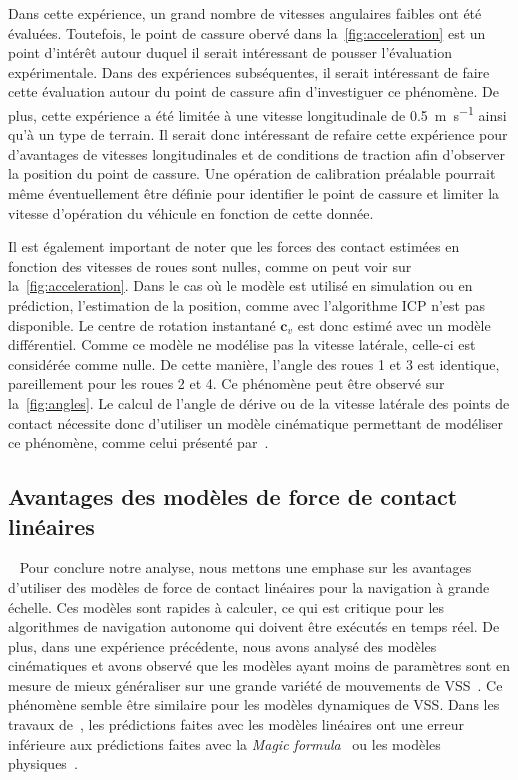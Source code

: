 Dans cette expérience, un grand nombre de vitesses angulaires faibles ont été évaluées.
Toutefois, le point de cassure obervé dans la~\autoref{fig:acceleration} est un point d'intérêt autour duquel il serait intéressant de pousser l'évaluation expérimentale.
Dans des expériences subséquentes, il serait intéressant de faire cette évaluation autour du point de cassure afin d'investiguer ce phénomène.
De plus, cette expérience a été limitée à une vitesse longitudinale de \SI{0.5}{\meter\per\second} ainsi qu'à un type de terrain.
Il serait donc intéressant de refaire cette expérience pour d'avantages de vitesses longitudinales et de conditions de traction afin d'observer la position du point de cassure.
Une opération de calibration préalable pourrait même éventuellement être définie pour identifier le point de cassure et limiter la vitesse d'opération du véhicule en fonction de cette donnée.

Il est également important de noter que les forces des contact estimées en fonction des vitesses de roues sont nulles, comme on peut voir sur la~\autoref{fig:acceleration}.
Dans le cas où le modèle est utilisé en simulation ou en prédiction, l'estimation de la position, comme avec l'algorithme \ac{ICP} n'est pas disponible.
Le centre de rotation instantané $\bm c_v$ est donc estimé avec un modèle différentiel.
Comme ce modèle ne modélise pas la vitesse latérale, celle-ci est considérée comme nulle. 
De cette manière, l'angle des roues 1 et 3 est identique, pareillement pour les roues 2 et 4.
Ce phénomène peut être observé sur la~\autoref{fig:angles}.
Le calcul de l'angle de dérive ou de la vitesse latérale des points de contact nécessite donc d'utiliser un modèle cinématique permettant de modéliser ce phénomène, comme celui présenté par~\citet{Seegmiller2014}.

\subsection{Avantages des modèles de force de contact linéaires}~\label{sec:ana_lineaire}
Pour conclure notre analyse, nous mettons une emphase sur les avantages d'utiliser des modèles de force de contact linéaires pour la navigation à grande échelle.
Ces modèles sont rapides à calculer, ce qui est critique pour les algorithmes de navigation autonome qui doivent être exécutés en temps réel.
De plus, dans une expérience précédente, nous avons analysé des modèles cinématiques et avons observé que les modèles ayant moins de paramètres sont en mesure de mieux généraliser sur une grande variété de mouvements de \ac{VSS}~\citep{Baril2020}.
Ce phénomène semble être similaire pour les modèles dynamiques de \ac{VSS}. 
Dans les travaux de~\citet{Seegmiller2016}, les prédictions faites avec les modèles linéaires ont une erreur inférieure aux prédictions faites avec la \textit{Magic formula}~\citep{Pacejka2012} ou les modèles physiques~\citep{Ishigami2007}.

